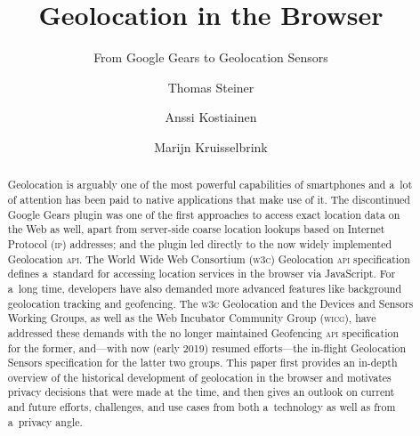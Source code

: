 \documentclass[sigconf,hyphens]{acmart}
\begin{document}
\title{Geolocation in the Browser}  

\subtitle{From Google Gears to Geolocation Sensors}

\author{Thomas Steiner}

\author{Anssi Kostiainen}

\author{Marijn Kruisselbrink}

\begin{abstract}
Geolocation is arguably one of the most powerful capabilities of smartphones
and a~lot of attention has been paid to native applications that make use of it.
The discontinued Google Gears plugin was one of the first approaches to access exact location data
on the Web as well, apart from server-side coarse location lookups
based on Internet Protocol (\textsc{ip}) addresses;
and the plugin led directly to the now widely implemented Geolocation \textsc{api}.
The World Wide Web Consortium (\textsc{w3c}) Geolocation \textsc{api} specification
defines a~standard for accessing location services in the browser via JavaScript.
For a~long time, developers have also demanded more advanced features
like background geolocation tracking and geofencing.
The \textsc{w3c} Geolocation and the Devices and Sensors Working Groups,
as well as the Web Incubator Community Group (\textsc{wicg}), have addressed these demands
with the no longer maintained Geofencing \textsc{api} specification for the former,
and---with now (early 2019) resumed efforts---the in-flight Geolocation Sensors specification
for the latter two groups.
This paper first provides an in-depth overview of the historical
development of geolocation in the browser
and motivates privacy decisions that were made at the time,
and then gives an outlook on current and future efforts, challenges, and use cases
from both a~technology as well as from a~privacy angle.
\end{abstract}

\maketitle
\end{document}

